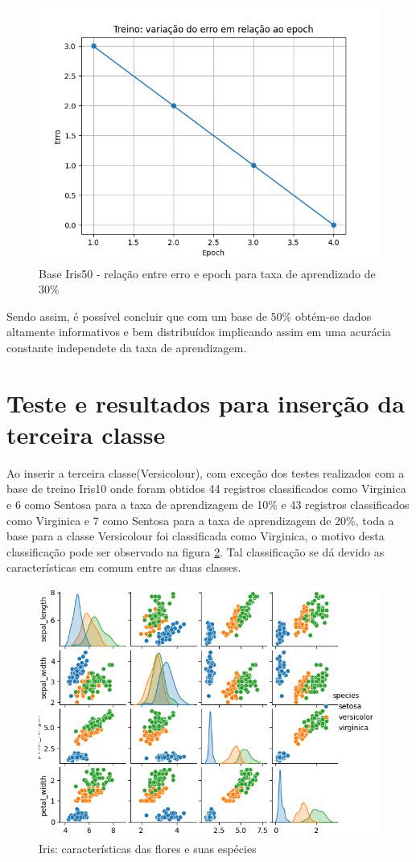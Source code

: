 \documentclass[12pt, %
openright, 
oneside, %
a4paper,    %
brazil]{facom-ufu-abntex2}
\begin{document}
\begin{figure}[H]
\centering
\includegraphics[scale=0.9]{figuras/erro_9.png}
\caption{Base Iris50 - relação entre erro e epoch para taxa de aprendizado de 30\%}
\label{fig:18}
\end{figure}

Sendo assim, é possível concluir que com um base de 50\% obtém-se dados altamente informativos e bem distribuídos implicando assim em uma acurácia constante independete da taxa de aprendizagem.

\section{Teste e resultados para inserção da terceira classe}
Ao inserir a terceira classe(Versicolour), com exceção dos testes realizados com a base de treino Iris10 onde foram obtidos 44 registros classificados como Virginica e 6 como Sentosa para a taxa de aprendizagem de 10\% e 43 registros classificados como Virginica e 7 como Sentosa para a taxa de aprendizagem de 20\%, toda a base para a classe Versicolour foi classificada como Virginica, o motivo desta classificação pode ser observado na figura \ref{fig:19}. Tal classificação se dá devido as características em comum entre as duas classes.
\begin{figure}[H]
\centering
\includegraphics[scale=0.9]{figuras/base_iris.png}
\caption{Iris: características das flores e suas espécies}
\label{fig:19}
\end{figure}
\end{document}
